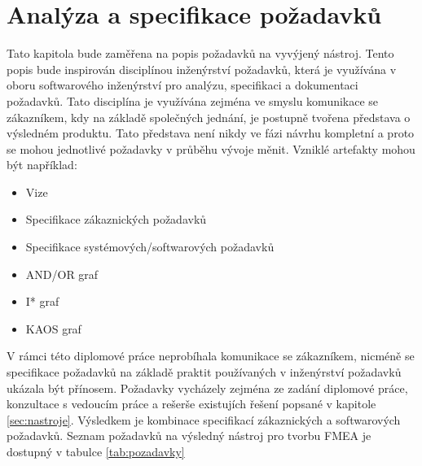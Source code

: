\chapter{Analýza a specifikace požadavků}
\label{sec:pozadavky}
Tato kapitola bude zaměřena na popis požadavků na vyvýjený nástroj. Tento popis bude inspirován disciplínou inženýrství požadavků, která je využívána v oboru softwarového inženýrství pro analýzu, specifikaci a dokumentaci požadavků. Tato disciplína je využívána zejména ve smyslu komunikace se zákazníkem, kdy na základě společných jednání, je postupně tvořena představa o výsledném produktu. Tato představa není nikdy ve fázi návrhu kompletní a proto se mohou jednotlivé požadavky v průběhu vývoje měnit. Vzniklé artefakty mohou být například:
    \begin{itemize}
    \item Vize
	\item Specifikace zákaznických požadavků
    \item Specifikace systémových/softwarových požadavků
    \item AND/OR graf
    \item I* graf
    \item KAOS graf 
\end{itemize}

V rámci této diplomové práce neprobíhala komunikace se zákazníkem, nicméně se specifikace požadavků na základě praktit používaných v inženýrství požadavků ukázala být přínosem. Požadavky vycházely zejména ze zadání diplomové práce, konzultace s vedoucím práce a rešerše existujích řešení popsané v kapitole \ref{sec:nastroje}. Výsledkem je kombinace specifikací zákaznických a softwarových požadavků. Seznam požadavků na výsledný nástroj pro tvorbu FMEA je dostupný v tabulce \ref{tab:pozadavky}
\break
\break
\break
\break
\break





